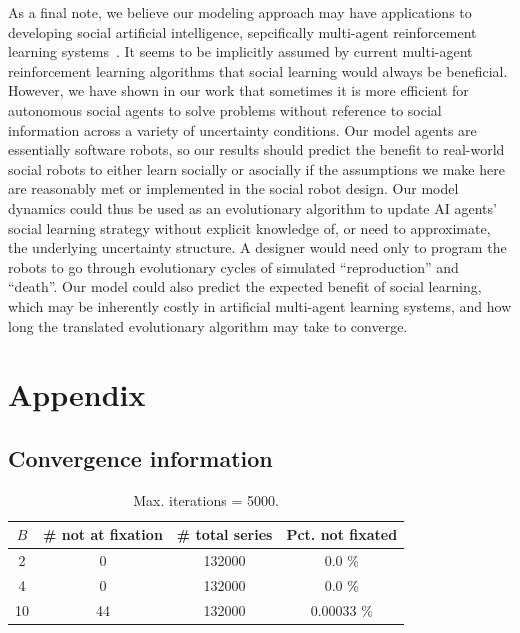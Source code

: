 \documentclass[letterpaper,11.5pt]{scrartcl}
\begin{document}
As a final note, we believe 
our modeling approach may have applications to developing social artificial
intelligence, sepcifically multi-agent reinforcement learning
systems~\cite{Sandholm1996,Ndousse2021,Gronauer2022,Jaques2019}.
It seems to be implicitly assumed by current multi-agent reinforcement learning
algorithms that social learning
would always be beneficial. However, we have shown in our work that sometimes 
it is more efficient for autonomous social agents to solve problems without
reference to social information across a variety of uncertainty conditions. 
Our model agents are essentially software
robots, so our results should predict the benefit to real-world social robots
to either learn socially or asocially if the assumptions we make here are 
reasonably met or implemented in the social robot design.
Our model dynamics could thus be used as an
evolutionary algorithm to update AI agents' social learning strategy without
explicit knowledge of, or need to approximate, the underlying uncertainty structure.
A designer would need only to program the robots to go through evolutionary
cycles of simulated ``reproduction'' and ``death''.
Our model could also predict the expected benefit of social learning, which may be
inherently costly in artificial multi-agent learning systems, and how long the
translated evolutionary algorithm may take to converge.



% 


\appendix


\section{Appendix}

\subsection{Convergence information}

\begin{table}[h]
  \caption{Max. iterations = 5000.}
  \label{tab:convergence}
  \centering
  \begin{tabular}{cccc} \toprule
    $B$ & \# not at fixation & \# total series & Pct. not fixated \\
    \midrule  
    2  & 0  & 132000 & 0.0 \% \\
    4  & 0  & 132000 & 0.0 \% \\
    10 & 44 & 132000 & 0.00033  \% \\
    \bottomrule
  \end{tabular} 
\end{table}
\end{document}
